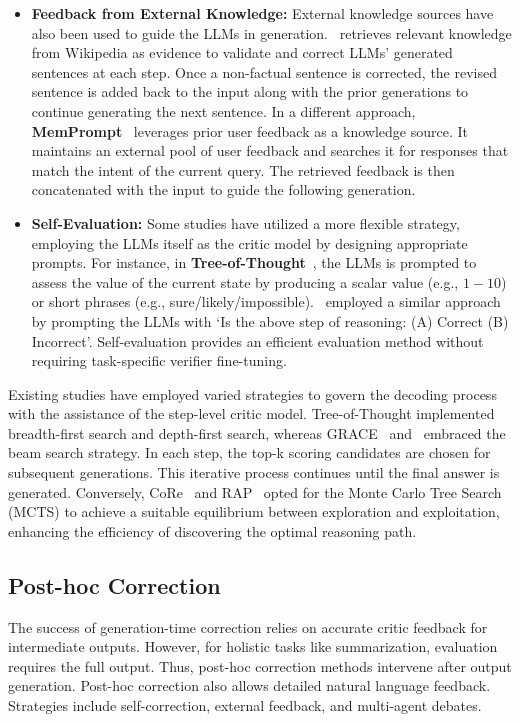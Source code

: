 \documentclass[12pt]{extarticle}
\begin{document}
\begin{itemize}
    \item \textbf{Feedback from External Knowledge:} External knowledge sources have also been used to guide the LLMs in generation.~\cite{varshney2023stitch} retrieves relevant knowledge from Wikipedia as evidence to validate and correct LLMs' generated sentences at each step. Once a non-factual sentence is corrected, the revised sentence is added back to the input along with the prior generations to continue generating the next sentence. In a different approach, \textbf{MemPrompt}~\cite{madaan-etal-2022-memory} leverages prior user feedback as a knowledge source. It maintains an external pool of user feedback and searches it for responses that match the intent of the current query. The retrieved feedback is then concatenated with the input to guide the following generation.

    \item \textbf{Self-Evaluation:} Some studies have utilized a more flexible strategy, employing the LLMs itself as the critic model by designing appropriate prompts. For instance, in \textbf{Tree-of-Thought}~\cite{yao2023tree}, the LLMs is prompted to assess the value of the current state by producing a scalar value (e.g., $1-10$) or short phrases (e.g., sure/likely/impossible).~\cite{xie2023selfevaluation} employed a similar approach by prompting the LLMs with `Is the above step of reasoning: (A) Correct (B) Incorrect'. Self-evaluation provides an efficient evaluation method without requiring task-specific verifier fine-tuning.
\end{itemize}

Existing studies have employed varied strategies to govern the decoding process with the assistance of the step-level critic model. Tree-of-Thought implemented breadth-first search and depth-first search, whereas GRACE~\cite{khalifa2023grace} and~\cite{xie2023selfevaluation} embraced the beam search strategy. In each step, the top-k scoring candidates are chosen for subsequent generations. This iterative process continues until the final answer is generated. Conversely, CoRe~\cite{zhu-etal-2023-solving} and RAP~\cite{hao2023reasoning} opted for the Monte Carlo Tree Search (MCTS) to achieve a suitable equilibrium between exploration and exploitation, enhancing the efficiency of discovering the optimal reasoning path.

\subsection{Post-hoc Correction}
The success of generation-time correction relies on accurate critic feedback for intermediate outputs. However, for holistic tasks like summarization, evaluation requires the full output. Thus, post-hoc correction methods intervene after output generation. Post-hoc correction also allows detailed natural language feedback. Strategies include self-correction, external feedback, and multi-agent debates.
\end{document}
